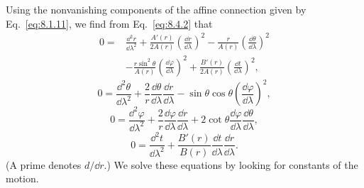 Using the nonvanishing components of the affine connection given by
Eq.~\eqref{eq:8.1.11}, we find from Eq.~\eqref{eq:8.4.2} that
\begin{equation}
  \begin{split}
  0={}&
  \frac{\dd^2r}{\dd\lambda^2}
  +\frac{A'(r)}{2A(r)}
    \left(\frac{\dd r}{\dd\lambda}\right)^2
  -\frac{r}{A(r)}
    \left(\frac{\dd\theta}{\dd\lambda}\right)^2\\
  &-\frac{r\sin^2\theta}{A(r)}
    \left(\frac{\dd\varphi}{\dd\lambda}\right)^2
  +\frac{B'(r)}{2A(r)}
    \left(\frac{\dd t}{\dd\lambda}\right)^2,
  \end{split}
  \tag{8.4.3}\label{eq:8.4.3}
\end{equation}
\begin{equation}
  0
  =
  \frac{\dd^2\theta}{\dd\lambda^2}
  +\frac{2}{r}\frac{\dd\theta}{\dd\lambda}\frac{\dd r}{\dd\lambda}
  -\sin\theta\cos\theta
  \left(\frac{\dd\varphi}{\dd\lambda}\right)^2,
  \tag{8.4.4}\label{eq:8.4.4}
\end{equation}
\begin{equation}
  0
  =
  \frac{\dd^2\varphi}{\dd\lambda^2}
  +\frac{2}{r}\frac{\dd\varphi}{\dd\lambda}\frac{\dd r}{\dd\lambda}
  +2\cot\theta
  \frac{\dd\varphi}{\dd\lambda}\frac{\dd\theta}{\dd\lambda},
  \tag{8.4.5}\label{eq:8.4.5}
\end{equation}
\begin{equation}
  0
  =
  \frac{\dd^2t}{\dd\lambda^2}
  +\frac{B'(r)}{B(r)}
  \frac{\dd t}{\dd\lambda}\frac{\dd r}{\dd\lambda}.
  \tag{8.4.6}\label{eq:8.4.6}
\end{equation}
(A prime denotes \(d/\dd r\).) We solve these equations by looking for
constants of the motion.

